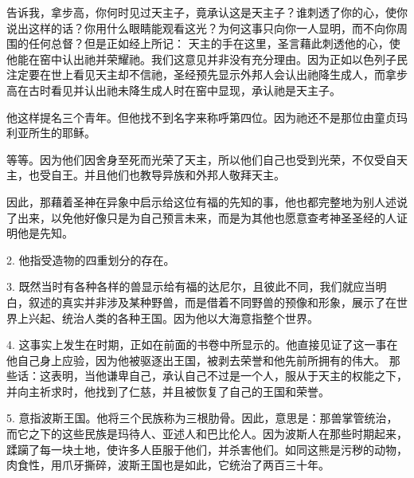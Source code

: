  告诉我，拿步高，你何时见过天主子，竟承认这是天主子？谁刺透了你的心，使你说出这样的话？你用什么眼睛能观看这光？为何这事只向你一人显明，而不向你周围的任何总督？但是正如经上所记： 天主的手在这里，圣言藉此刺透他的心，使他能在窑中认出祂并荣耀祂。我们这意见并非没有充分理由。因为正如以色列子民注定要在世上看见天主却不信祂，圣经预先显示外邦人会认出祂降生成人，而拿步高在古时看见并认出祂未降生成人时在窑中显现，承认祂是天主子。\par

 他这样提名三个青年。但他找不到名字来称呼第四位。因为祂还不是那位由童贞玛利亚所生的耶稣。\par

 等等。因为他们因舍身至死而光荣了天主，所以他们自己也受到光荣，不仅受自天主，也受自王。并且他们也教导异族和外邦人敬拜天主。\par

 因此，那藉着圣神在异象中启示给这位有福的先知的事，他也都完整地为别人述说了出来，以免他好像只是为自己预言未来，而是为其他也愿意查考神圣圣经的人证明他是先知。\par

2. 他指受造物的四重划分的存在。\par

3. 既然当时有各种各样的兽显示给有福的达尼尔，且彼此不同，我们就应当明白，叙述的真实并非涉及某种野兽，而是借着不同野兽的预像和形象，展示了在世界上兴起、统治人类的各种王国。因为他以大海意指整个世界。\par

4. 这事实上发生在时期，正如在前面的书卷中所显示的。他直接见证了这一事在他自己身上应验，因为他被驱逐出王国，被剥去荣誉和他先前所拥有的伟大。 那些话：这表明，当他谦卑自己，承认自己不过是一个人，服从于天主的权能之下，并向主祈求时，他找到了仁慈，并且被恢复了自己的王国和荣誉。\par

5. 意指波斯王国。他将三个民族称为三根肋骨。因此，意思是：那兽掌管统治，而它之下的这些民族是玛待人、亚述人和巴比伦人。因为波斯人在那些时期起来，蹂躏了每一块土地，使许多人臣服于他们，并杀害他们。如同这熊是污秽的动物，肉食性，用爪牙撕碎，波斯王国也是如此，它统治了两百三十年。\par

